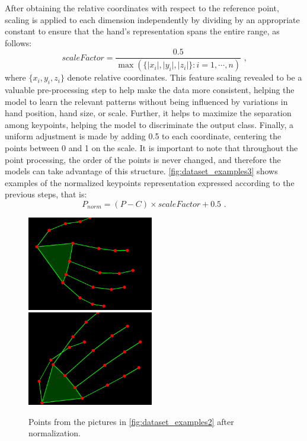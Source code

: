 After obtaining the relative coordinates with respect to the reference point, scaling is applied to each dimension independently by dividing by an appropriate constant to ensure that the hand’s representation spans the entire range, as follows:
\begin{equation}
scaleFactor = \frac {0.5}{\max(\{\lvert x_i \rvert,\lvert y_i \rvert,\lvert z_i\rvert\}: i=1,\cdots,n)} \text{  ,}
\end{equation}
%
where $\{x_i,y_i,z_i\}$ denote relative coordinates. This feature scaling revealed to be a valuable pre-processing step to help make the data more consistent, helping the model to learn the relevant patterns without being influenced by variations in hand position, hand size, or scale. Further, it helps to maximize the separation among keypoints, helping the model to discriminate the output class. Finally, a uniform adjustment is made by adding 0.5 to each coordinate, centering the points between 0 and 1 on the scale. It is important to note that throughout the point processing, the order of the points is never changed, and therefore the models can take advantage of this structure. \autoref{fig:dataset_examples3} shows examples of the normalized keypoints representation expressed according to the previous steps, that is: 
\begin{equation}
P_{norm} = (P - C) \times scaleFactor + 0.5\text{ .}
\end{equation}

\begin{figure}[ht]
    \centerline{\includegraphics[width=0.49\textwidth]{figs/dataset_preprocessing3_1.png} \ \includegraphics[width=0.49\textwidth]{figs/dataset_preprocessing3_2.png}}
    \caption{Points from the pictures in \autoref{fig:dataset_examples2} after normalization.}
    \label{fig:dataset_examples3}
\end{figure}


